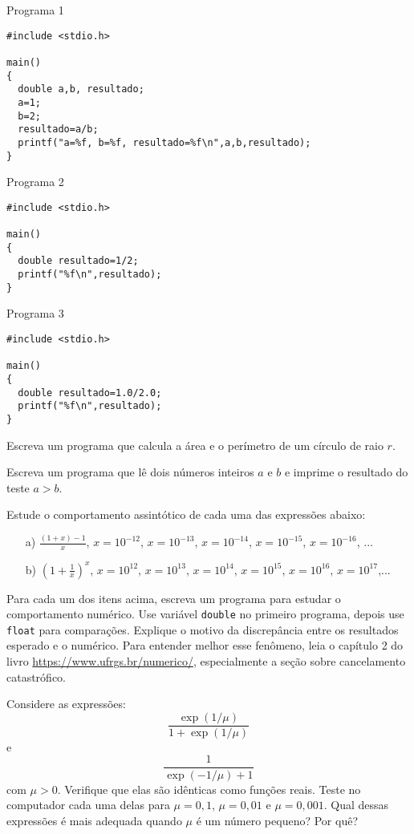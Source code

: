 Programa 1
\begin{verbatim}
#include <stdio.h>

main()
{
  double a,b, resultado;
  a=1;
  b=2;
  resultado=a/b;
  printf("a=%f, b=%f, resultado=%f\n",a,b,resultado); 
}
\end{verbatim}

Programa 2
\begin{verbatim}
#include <stdio.h>

main()
{
  double resultado=1/2;
  printf("%f\n",resultado); 
}
\end{verbatim}

Programa 3
\begin{verbatim}
#include <stdio.h>

main()
{
  double resultado=1.0/2.0;
  printf("%f\n",resultado); 
}
\end{verbatim}

\begin{exer}
 Escreva um programa que calcula a área e o perímetro de um círculo de raio $r$.
\end{exer}
\begin{exer}Escreva um programa que lê dois números inteiros $a$ e $b$ e imprime o resultado do teste $a>b$. 
\end{exer}

\begin{exer}
Estude o comportamento assintótico de cada uma das expressões abaixo:
 \begin{itemize}
  \item[a)] $\frac{(1+x)-1}{x}$, $x=10^{-12}$, $x=10^{-13}$, $x=10^{-14}$, $x=10^{-15}$, $x=10^{-16}$, ...
  \item[b)] $\left(1+\frac{1}{x}\right)^x$, $x=10^{12}$, $x=10^{13}$, $x=10^{14}$, $x=10^{15}$, $x=10^{16}$, $x=10^{17}$,...
 \end{itemize}
Para cada um dos itens acima, escreva um programa para estudar o comportamento numérico. Use variável \verb|double| no primeiro programa, depois use \verb|float| para comparações. Explique o motivo da discrepância entre os resultados esperado e o numérico. Para entender melhor esse fenômeno, leia o capítulo 2 do livro \url{https://www.ufrgs.br/numerico/}, especialmente a seção sobre cancelamento catastrófico.
\end{exer}
\begin{exer}
Considere as expressões:
  \begin{equation*}
    \frac{\exp(1/\mu)}{1+\exp(1/\mu)}  
  \end{equation*}
e
\begin{equation*}
  \frac{1}{\exp(-1/\mu)+1}
\end{equation*}
com $\mu>0$. Verifique que elas são idênticas como funções reais. Teste no computador cada uma delas para $\mu=0,1$, $\mu=0,01$ e $\mu=0,001$. Qual dessas expressões é mais adequada quando $\mu$ é um número pequeno? Por quê?
\end{exer}

